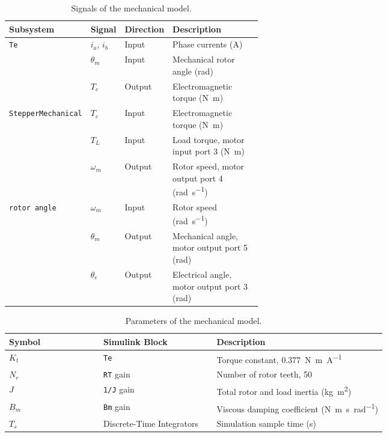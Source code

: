\begin{table}[htbp]
	\centering
	\caption{Signals of the mechanical model.}
	\vspace{4pt}
	\label{tab:mech_signals}
	\begin{tabular}{ll>{\raggedright\arraybackslash}p{0.13\linewidth}>{\raggedright\arraybackslash}p{0.36\linewidth}}
		\hline
		Subsystem & Signal & Direction & Description \\
		\hline
		\texttt{Te}                & $i_a$, $i_b$ & Input  & Phase currents (\si{\ampere}) \\
		& $\theta_m$   & Input  & Mechanical rotor angle (\si{\radian}) \\
		& $T_e$        & Output & Electromagnetic torque (\si{\newton\metre}) \\
		\texttt{StepperMechanical} & $T_e$        & Input  & Electromagnetic torque (\si{\newton\metre}) \\
		& $T_L$        & Input  & Load torque, motor input port 3 (\si{\newton\metre}) \\
		& $\omega_m$   & Output & Rotor speed, motor output port 4 (\si{\radian\per\second}) \\
		\texttt{rotor angle}       & $\omega_m$   & Input  & Rotor speed (\si{\radian\per\second}) \\
		& $\theta_m$   & Output & Mechanical angle, motor output port 5 (\si{\radian}) \\
		& $\theta_e$   & Output & Electrical angle, motor output port 3 (\si{\radian}) \\
		\hline
	\end{tabular}
\end{table}

\begin{table}[htbp]
	\centering
	\caption{Parameters of the mechanical model.}
	\vspace{4pt}
	\label{tab:mech_params}
	\begin{tabular}{l>{\raggedright\arraybackslash}p{0.3\linewidth}>{\raggedright\arraybackslash}p{0.45\linewidth}}
		\hline
		Symbol & Simulink Block & Description \\
		\hline
		$K_t$  & \texttt{Te}               & Torque constant, \SI{0.377}{\newton\metre\per\ampere} \\
		$N_r$  & \texttt{RT} gain          & Number of rotor teeth, 50 \\
		$J$    & \texttt{1/J} gain         & Total rotor and load inertia (\si{\kilogram\metre\squared}) \\
		$B_m$  & \texttt{Bm} gain          & Viscous damping coefficient (\si{\newton\metre\second\per\radian}) \\
		$T_s$  & Discrete-Time Integrators & Simulation sample time (\si{\second}) \\
		\hline
	\end{tabular}
\end{table}


